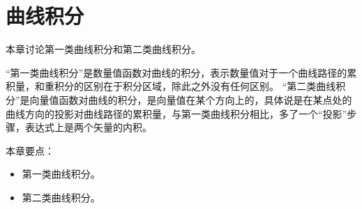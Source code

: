 \chapter{曲线积分}

本章讨论第一类曲线积分和第二类曲线积分。

“第一类曲线积分”是数量值函数对曲线的积分，表示数量值对于一个曲线路径的累积量，和重积分的区别在于积分区域，除此之外没有任何区别。
“第二类曲线积分”是向量值函数对曲线的积分，是向量值在某个方向上的，具体说是在某点处的曲线方向的投影对曲线路径的累积量，与第一类曲线积分相比，多了一个“投影”步骤，表达式上是两个矢量的内积。

本章要点：
\begin{itemize}
    \item 第一类曲线积分。
    \item 第二类曲线积分。
\end{itemize}

~

\newpage


\newpage


\newpage


\newpage





